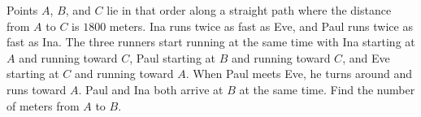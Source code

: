 Points $A$, $B$, and $C$ lie in that order along a straight path where the distance from $A$ to $C$ is $1800$ meters. Ina runs twice as fast as Eve, and Paul runs twice as fast as Ina. The three runners start running at the same time with Ina starting at $A$ and running toward $C$, Paul starting at $B$ and running toward $C$, and Eve starting at $C$ and running toward $A$. When Paul meets Eve, he turns around and runs toward $A$. Paul and Ina both arrive at $B$ at the same time. Find the number of meters from $A$ to $B$.